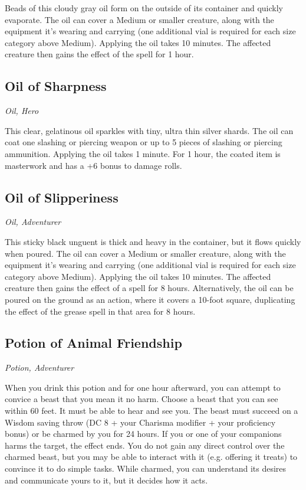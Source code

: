 Beads of this cloudy gray oil form on the outside of its container and quickly evaporate. The oil can cover a Medium or smaller creature, along with the equipment it's wearing and carrying (one additional vial is required for each size category above Medium). Applying the oil takes 10 minutes. The affected creature then gains the effect of the  spell for 1 hour.

\subsection{Oil of Sharpness}
\textit{Oil, Hero}

This clear, gelatinous oil sparkles with tiny, ultra thin silver shards. The oil can coat one slashing or piercing weapon or up to 5 pieces of slashing or piercing ammunition. Applying the oil takes 1 minute. For 1 hour, the coated item is masterwork and has a +6 bonus to damage rolls.

\subsection{Oil of Slipperiness}
\textit{Oil, Adventurer} 

This sticky black unguent is thick and heavy in the container, but it flows quickly when poured. The oil can cover a Medium or smaller creature, along with the equipment it's wearing and carrying (one additional vial is required for each size category above Medium). Applying the oil takes 10 minutes. The affected creature then gains the effect of a  spell for 8 hours. Alternatively, the oil can be poured on the ground as an action, where it covers a 10-foot square, duplicating the effect of the grease spell in that area for 8 hours.

\subsection{Potion of Animal Friendship}
\textit{Potion, Adventurer}

When you drink this potion and for one hour afterward, you can attempt to convice a beast that you mean it no harm. Choose a beast that you can see within 60 feet. It must be able to hear and see you. The beast must succeed on a Wisdom saving throw (DC 8 + your Charisma modifier + your proficiency bonus) or be charmed by you for 24 hours. If you or one of your companions harms the target, the effect ends. You do not gain any direct control over the charmed beast, but you may be able to interact with it (e.g. offering it treats) to convince it to do simple tasks. While charmed, you can understand its desires and communicate yours to it, but it decides how it acts.

